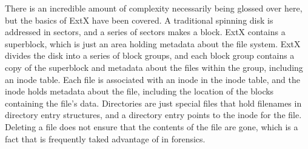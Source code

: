 There is an incredible amount of complexity necessarily being glossed over here, but the basics of ExtX have been covered.
A traditional spinning disk is addressed in sectors, and a series of sectors makes a block. ExtX contains a superblock,
which is just an area holding metadata about the file system. ExtX divides the disk into a series of block groups, and each
block group contains a copy of the superblock and metadata about the files within the group, including an inode table. Each file is
associated with an inode in the inode table, and the inode holds metadata about the file, including the location of the blocks
containing the file's data. Directories are just special files that hold filenames in directory entry structures, and a directory entry
points to the inode for the file. Deleting a file does not ensure that the contents of the file are gone, which is a fact that is frequently
taked advantage of in forensics.

